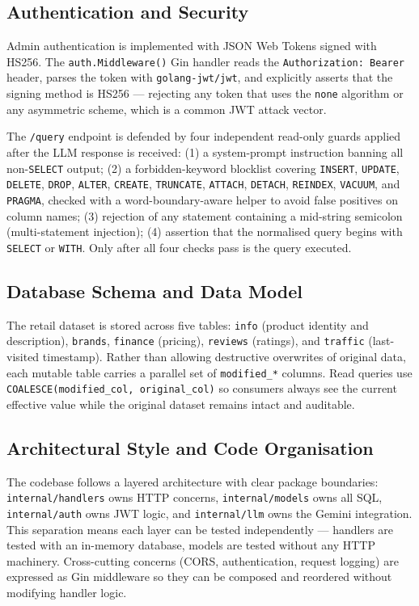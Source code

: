 \documentclass[8pt,a4paper]{article}
\begin{document}
\subsection{Authentication and Security}
Admin authentication is implemented with JSON Web Tokens signed with HS256. The \texttt{auth.Middleware()} Gin handler reads the \texttt{Authorization: Bearer} header, parses the token with \texttt{golang-jwt/jwt}, and explicitly asserts that the signing method is HS256 — rejecting any token that uses the \texttt{none} algorithm or any asymmetric scheme, which is a common JWT attack vector.

The \texttt{/query} endpoint is defended by four independent read-only guards applied after the LLM response is received: (1) a system-prompt instruction banning all non-\texttt{SELECT} output; (2) a forbidden-keyword blocklist covering \texttt{INSERT}, \texttt{UPDATE}, \texttt{DELETE}, \texttt{DROP}, \texttt{ALTER}, \texttt{CREATE}, \texttt{TRUNCATE}, \texttt{ATTACH}, \texttt{DETACH}, \texttt{REINDEX}, \texttt{VACUUM}, and \texttt{PRAGMA}, checked with a word-boundary-aware helper to avoid false positives on column names; (3) rejection of any statement containing a mid-string semicolon (multi-statement injection); (4) assertion that the normalised query begins with \texttt{SELECT} or \texttt{WITH}. Only after all four checks pass is the query executed.

\subsection{Database Schema and Data Model}
The retail dataset is stored across five tables: \texttt{info} (product identity and description), \texttt{brands}, \texttt{finance} (pricing), \texttt{reviews} (ratings), and \texttt{traffic} (last-visited timestamp). Rather than allowing destructive overwrites of original data, each mutable table carries a parallel set of \texttt{modified\_*} columns. Read queries use \texttt{COALESCE(modified\_col, original\_col)} so consumers always see the current effective value while the original dataset remains intact and auditable.

\subsection{Architectural Style and Code Organisation}
The codebase follows a layered architecture with clear package boundaries: \texttt{internal/handlers} owns HTTP concerns, \texttt{internal/models} owns all SQL, \texttt{internal/auth} owns JWT logic, and \texttt{internal/llm} owns the Gemini integration. This separation means each layer can be tested independently — handlers are tested with an in-memory database, models are tested without any HTTP machinery. Cross-cutting concerns (CORS, authentication, request logging) are expressed as Gin middleware so they can be composed and reordered without modifying handler logic.
\end{document}
